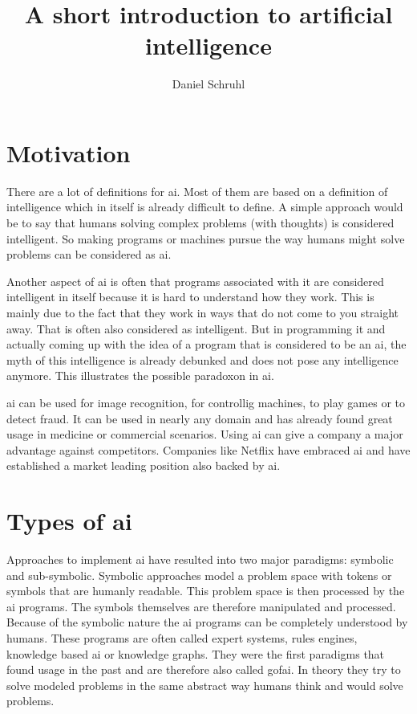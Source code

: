 \documentclass[jou,apacite]{apa6}
\title{A short introduction to artificial intelligence}
\author{Daniel Schruhl}
\affiliation{ThoughtWorks}
\begin{document}
\maketitle    
                        
\section{Motivation}
There are a lot of definitions for \gls{ai}. Most of them are based on a definition of intelligence which in itself is already difficult to define. A simple approach would be to say that humans solving complex problems (with thoughts) is considered intelligent. So making programs or machines pursue the way humans might solve problems can be considered as \gls{ai}.

Another aspect of \gls{ai} is often that programs associated with it are considered intelligent in itself because it is hard to understand how they work. This is mainly due to the fact that they work in ways that do not come to you straight away. That is often also considered as intelligent.
But in programming it and actually coming up with the idea of a program that is considered to be an \gls{ai}, the myth of this intelligence is already debunked and does not pose any intelligence anymore. This illustrates the possible paradoxon in \gls{ai}.

\gls{ai} can be used for image recognition, for controllig machines, to play games or to detect fraud. It can be used in nearly any domain and has already found great usage in medicine or commercial scenarios. Using \gls{ai} can give a company a major advantage against competitors. Companies like Netflix have embraced \gls{ai} \cite{Gomez-Uribe2015} and have established a market leading position also backed by \gls{ai}.

\section{Types of \gls{ai}}
Approaches to implement \gls{ai} have resulted into two major paradigms: symbolic and sub-symbolic. Symbolic approaches model a problem space with tokens or symbols that are humanly readable. This problem space is then processed by the \gls{ai} programs. The symbols themselves are therefore manipulated and processed. Because of the symbolic nature the \gls{ai} programs can be completely understood by humans. These programs are often called expert systems, rules engines, knowledge based \gls{ai} or knowledge graphs. They were the first paradigms that found usage in the past and are therefore also called \gls{gofai}. In theory they try to solve modeled problems in the same abstract way humans think and would solve problems.
\end{document}
